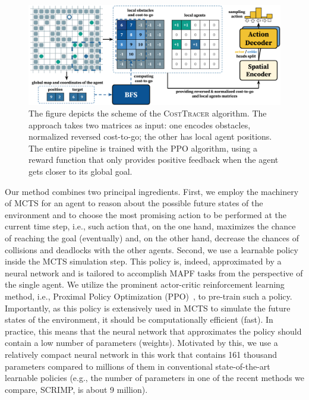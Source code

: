 \documentclass[letterpaper]{article} %
\begin{document}
\begin{figure}[htb!]
    \centering
    \includegraphics[width=1.0\textwidth]{figures/02-cost-tracer.pdf}
    \caption{The figure depicts the scheme of the \textsc{CostTracer} algorithm. The approach  takes two matrices as input: one encodes obstacles, normalized reversed cost-to-go; the other has local agent positions. The entire pipeline is trained with the PPO algorithm, using a reward function that only provides positive feedback when the agent gets closer to its global goal.}
    \label{fig:scheme-cost-tracer}

\end{figure}

Our method combines two principal ingredients. First, we employ the machinery of MCTS for an agent to reason about the possible future states of the environment and to choose the most promising action to be performed at the current time step, i.e., such action that, on the one hand, maximizes the chance of reaching the goal (eventually) and, on the other hand, decrease the chances of collisions and deadlocks with the other agents. Second, we use a learnable policy inside the MCTS simulation step. This policy is, indeed, approximated by a neural network and is tailored to accomplish MAPF tasks from the perspective of the single agent. We utilize the prominent actor-critic reinforcement learning method, i.e., Proximal Policy Optimization (PPO)~\cite{schulman2017proximal}, to pre-train such a policy. Importantly, as this policy is extensively used in MCTS to simulate the future states of the environment, it should be computationally efficient (fast). In practice, this means that the neural network that approximates the policy should contain a low number of parameters (weights). Motivated by this, we use a relatively compact neural network in this work that contains 161 thousand parameters compared to millions of them in conventional state-of-the-art learnable policies (e.g., the number of parameters in one of the recent methods we compare, SCRIMP, is about 9 million).
\end{document}
